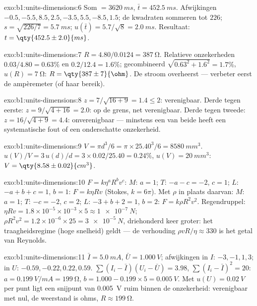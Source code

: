 \begin{solution}{exo:b1:units-dimensions:6}
Som $= \qty{3620}{ms}$, $\bar t = \qty{452.5}{ms}$. Afwijkingen
$-0.5, -5.5, 8.5, 2.5, -3.5, 5.5, -8.5, 1.5$; de kwadraten sommeren tot $226$;
$s = \sqrt{226/7} = \qty{5.7}{ms}$; $u(\bar t) = 5.7/\sqrt8 = \qty{2.0}{ms}$.
Resultaat: $t = \qty{452.5\pm2.0}{ms}$.
\end{solution}

\begin{solution}{exo:b1:units-dimensions:7}
$R = 4.80/0.0124 = \qty{387}{\ohm}$. Relatieve onzekerheden $0.03/4.80 =
0.63\%$ en $0.2/12.4 = 1.6\%$; gecombineerd $\sqrt{0.63^2 + 1.6^2} = 1.7\%$,
$u(R) = \qty{7}{\ohm}$: $R = \qty{387\pm7}{\ohm}$. De stroom
overheerst --- verbeter eerst de ampèremeter (of haar bereik).
\end{solution}

\begin{solution}{exo:b1:units-dimensions:8}
$z = 7/\sqrt{16 + 9} = 1.4 \leq 2$: verenigbaar.
Derde tegen eerste: $z = 9/\sqrt{4 + 16} = 2.0$: op de grens, net
verenigbaar. Derde tegen tweede: $z = 16/\sqrt{4 + 9} = 4.4$: onverenigbaar
--- minstens een van beide heeft een systematische fout of een
onderschatte onzekerheid.
\end{solution}

\begin{solution}{exo:b1:units-dimensions:9}
$V = \pi d^3/6 = \pi \times 25.40^3/6 = \qty{8580}{mm^3}$.
$u(V)/V = 3\,u(d)/d = 3 \times 0.02/25.40 = 0.24\%$,
$u(V) = \qty{20}{mm^3}$: $V = \qty{8.58\pm0.02}{cm^3}$.
\end{solution}

\begin{solution}{exo:b1:units-dimensions:10}
$F = k\eta^a R^b v^c$: $M$: $a = 1$; $T$: $-a - c = -2$, $c = 1$;
$L$: $-a + b + c = 1$, $b = 1$: $F = k\eta R v$ (Stokes, $k = 6\pi$).
Met $\rho$ in plaats daarvan: $M$: $a = 1$; $T$: $-c = -2$, $c = 2$; $L$:
$-3 + b + 2 = 1$, $b = 2$: $F = k\rho R^2 v^2$.
Regendruppel: $\eta R v = 1.8\times10^{-5} \times 10^{-3} \times 5 \approx
\qty{1e-7}{N}$; $\rho R^2 v^2 = 1.2 \times 10^{-6} \times 25 =
\qty{3e-5}{N}$, driehonderd keer groter: het traagheidsregime (hoge snelheid)
geldt --- de verhouding $\rho v R/\eta \approx 330$ is het getal van
Reynolds.
\end{solution}

\begin{solution}{exo:b1:units-dimensions:11}
$\bar I = \qty{5.0}{mA}$, $\bar U = \qty{1.000}{V}$; afwijkingen in $I$:
$-3, -1, 1, 3$; in $U$: $-0.59, -0.22, 0.22, 0.59$.
$\sum (I_i - \bar I)(U_i - \bar U) = 3.98$, $\sum (I_i - \bar I)^2 = 20$:
$a = \qty{0.199}{V/mA} = \qty{199}{\ohm}$, $b = 1.000 - 0.199 \times 5 =
\qty{0.005}{V}$. Met $u(U) = \qty{0.02}{V}$ per punt ligt een snijpunt van
\qty{0.005}{V} ruim binnen de onzekerheid: verenigbaar met nul, de
weerstand is ohms, $R \approx \qty{199}{\ohm}$.
\end{solution}

